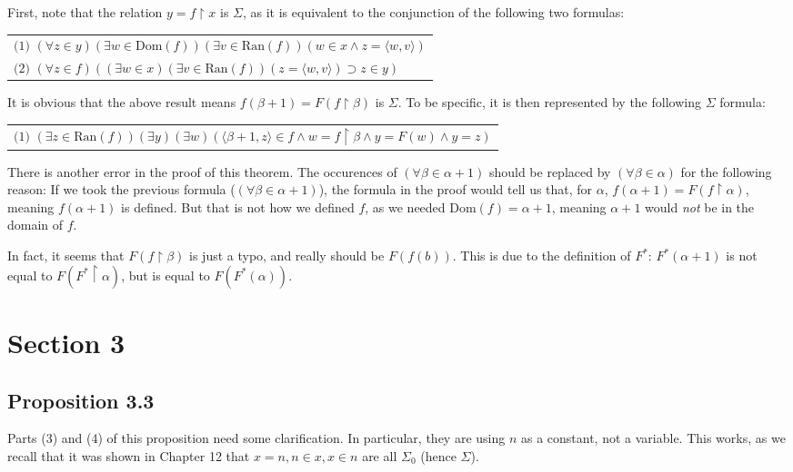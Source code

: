 \documentclass{article}
\theoremstyle{definition}
\begin{document}
First, note that the relation $y=f\restriction x$ is $\Sigma$, as it is equivalent to the conjunction of the 
following two formulas:
\begin{center}
\begin{tabular}{l}
$\textrm{(1) }(\forall z\in y)(\exists w\in\textrm{Dom}(f))(\exists v\in\textrm{Ran}(f))(w\in x\wedge z=\langle w,v\rangle)$ \\
$\textrm{(2) }(\forall z\in f)((\exists w\in x)(\exists v\in\textrm{Ran}(f))(z=\langle w,v\rangle)\supset z\in y)$
\end{tabular}
\end{center}

It is obvious that the above result means $f(\beta+1)=F(f\restriction\beta)$ is $\Sigma$. To be specific, it is 
then represented by the following $\Sigma$ formula:
\begin{center}
\begin{tabular}{l}
$\textrm{(1) }(\exists z\in\textrm{Ran}(f))(\exists y)(\exists w)(\langle\beta+1,z\rangle\in f\wedge w=f\restriction\beta\wedge y=F(w)\wedge y=z)$
\end{tabular}
\end{center}

There is another error in the proof of this theorem. The occurences of $(\forall\beta\in\alpha+1)$ should be 
replaced by $(\forall\beta\in\alpha)$ for the following reason: If we took the previous formula
($(\forall\beta\in\alpha+1)$), the formula in the proof would tell us that, for $\alpha$, $f(\alpha+1)=F(f\restriction\alpha)$, 
meaning $f(\alpha+1)$ is defined. But that is not how we defined $f$, as we needed $\textrm{Dom}(f)=\alpha+1$, meaning 
$\alpha+1$ would \textit{not} be in the domain of $f$.

In fact, it seems that $F(f\restriction\beta)$ is just a typo, and really should be $F(f(b))$. This is due to the definition of 
$F^*$: $F^*(\alpha+1)$ is not equal to $F(F^*\restriction\alpha)$, but is equal to $F(F^*(\alpha))$.

\section*{Section 3}

\subsection*{Proposition 3.3}
Parts (3) and (4) of this proposition need some clarification. In particular, they are using $n$ as a constant, not a variable. 
This works, as we recall that it was shown in Chapter 12 that $x=n,n\in x,x\in n$ are all $\Sigma_0$ (hence $\Sigma$).
\end{document}
